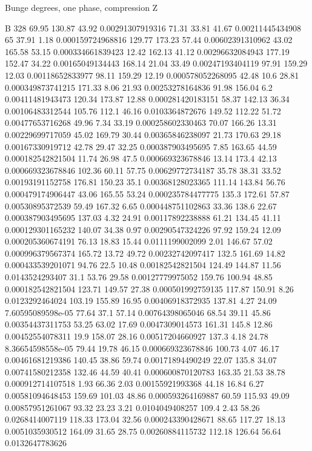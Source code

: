 Bunge degrees, one phase, compression Z


B 328
69.95 130.87 43.92 0.00291307919316
71.31 33.81 41.67 0.00211445434908
65 37.91 1.18 0.000159724968816
129.77 173.23 57.44 0.00602391310962
43.02 165.58 53.15 0.000334661839423
12.42 162.13 41.12 0.00296632084943
177.19 152.47 34.22 0.00165049134443
168.14 21.04 33.49 0.00247193404119
97.91 159.29 12.03 0.00118652833977
98.11 159.29 12.19 0.000578052268095
42.48 10.6 28.81 0.000349873741215
171.33 8.06 21.93 0.00253278164836
91.98 156.04 6.2 0.00411481943473
120.34 173.87 12.88 0.000281420183151
58.37 142.13 36.34 0.00106483312544
105.76 112.1 46.16 0.0103364872676
149.52 112.22 51.72 0.00477653716268
49.96 7.34 33.19 0.000258602330463
70.07 166.26 13.31 0.00229699717059
45.02 169.79 30.44 0.00365846238097
21.73 170.63 29.18 0.00167330919712
42.78 29.47 32.25 0.000387903495695
7.85 163.65 44.59 0.000182542821504
11.74 26.98 47.5 0.000669323678846
13.14 173.4 42.13 0.000669323678846
102.36 60.11 57.75 0.00629772734187
35.78 38.31 33.52 0.00193191152758
176.81 150.23 35.1 0.00368128023365
111.14 143.84 56.76 0.000479174906447
43.06 165.55 53.24 0.000235784477775
135.3 172.61 57.87 0.00530895372539
59.49 167.32 6.65 0.000448751102863
33.36 138.6 22.67 0.000387903495695
137.03 4.32 24.91 0.00117892238888
61.21 134.45 41.11 0.000129301165232
140.07 34.38 0.97 0.00290547324226
97.92 159.24 12.09 0.000205360674191
76.13 18.83 15.44 0.0111199002099
2.01 146.67 57.02 0.000996379567374
165.72 13.72 49.72 0.00232742097417
132.5 161.69 14.82 0.000433539201071
94.76 22.5 10.48 0.00182542821504
124.49 144.87 11.56 0.0143524293407
31.1 53.76 29.58 0.00127779975052
159.76 100.94 48.85 0.000182542821504
123.71 149.57 27.38 0.000501992759135
117.87 150.91 8.26 0.0123292464024
103.19 155.89 16.95 0.00406918372935
137.81 4.27 24.09 7.60595089598e-05
77.64 37.1 57.14 0.00764398065046
68.54 39.11 45.86 0.00354437311753
53.25 63.02 17.69 0.0047309014573
161.31 145.8 12.86 0.00452554078311
19.9 158.07 28.16 0.00517204660927
137.3 4.18 24.78 8.36654598558e-05
79.44 19.78 46.15 0.000669323678846
100.73 4.07 46.17 0.00461681219386
140.45 38.86 59.74 0.00171894490249
22.07 135.8 34.07 0.00741580212358
132.46 44.59 40.41 0.000600870120783
163.35 21.53 38.78 0.000912714107518
1.93 66.36 2.03 0.00155921993368
44.18 16.84 6.27 0.00581094648453
159.69 101.03 48.86 0.000593264169887
60.59 115.93 49.09 0.00857951261067
93.32 23.23 3.21 0.0104049408257
109.4 2.43 58.26 0.0268414007119
118.33 173.04 32.56 0.000243390428671
88.65 117.27 18.13 0.0051035930512
164.09 31.65 28.75 0.00260884115732
112.18 126.64 56.64 0.0132647783626
